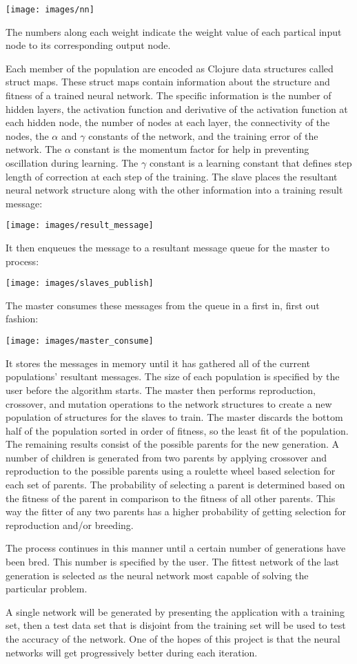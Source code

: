 \texttt{[image: images/nn]}

The numbers along each weight indicate the weight value of each partical input node to its corresponding output node. 

Each member of the population are encoded as Clojure data structures called struct maps. 
These struct maps contain information about the structure and fitness of a trained neural network. 
The specific information is the number of hidden layers, the activation function and derivative of the activation function at each hidden node, the number of nodes at each layer, the connectivity of the nodes, the $\alpha$ and $\gamma$ constants of the network, and the training error of the network. 
The $\alpha$ constant is the momentum factor for help in preventing oscillation during learning. 
The $\gamma$ constant is a learning constant that defines step length of correction at each step of the training.
The slave places the resultant neural network structure along with the other information into a training result message:

\texttt{[image: images/result\_message]}

It then enqueues the message to a resultant message queue for the master to process:

\texttt{[image: images/slaves\_publish]} 

The master consumes these messages from the queue in a first in, first out fashion:

\texttt{[image: images/master\_consume]} 

It stores the messages in memory until it has gathered all of the current populations' resultant messages. 
The size of each population is specified by the user before the algorithm starts.
The master then performs reproduction, crossover, and mutation operations to the network structures to create a new population of structures for the slaves to train.
The master discards the bottom half of the population sorted in order of fitness, so the least fit of the population. 
The remaining results consist of the possible parents for the new generation. 
A number of children is generated from two parents by applying crossover and reproduction to the possible parents using a roulette wheel based selection for each set of parents. 
The probability of selecting a parent is determined based on the fitness of the parent in comparison to the fitness of all other parents. 
This way the fitter of any two parents has a higher probability of getting selection for reproduction and/or breeding.

The process continues in this manner until a certain number of generations have been bred. 
This number is specified by the user. 
The fittest network of the last generation is selected as the neural network most capable of solving the particular problem.  

A single network will be generated by presenting the application with a training set, then a test data set that is disjoint from the training set will be used to test the accuracy of the network.
One of the hopes of this project is that the neural networks will get progressively better during each iteration. 

